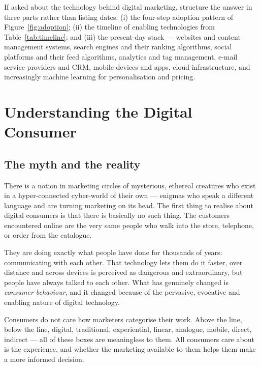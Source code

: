 \documentclass{MMTextbook}
\begin{document}
\begin{exambox}
If asked about the technology behind digital marketing, structure the answer in
three parts rather than listing dates: (i) the four-step adoption pattern of
Figure~\ref{fig:adoption}; (ii) the timeline of enabling technologies from
Table~\ref{tab:timeline}; and (iii) the present-day stack --- websites and
content management systems, search engines and their ranking algorithms, social
platforms and their feed algorithms, analytics and tag management, e-mail
service providers and CRM, mobile devices and apps, cloud infrastructure, and
increasingly machine learning for personalisation and pricing.
\end{exambox}

\section{Understanding the Digital Consumer}

\subsection{The myth and the reality}

There is a notion in marketing circles of mysterious, ethereal creatures who
exist in a hyper-connected cyber-world of their own --- enigmas who speak a
different language and are turning marketing on its head. The first thing to
realise about digital consumers is that there is basically no such thing. The
customers encountered online are the very same people who walk into the store,
telephone, or order from the catalogue.

They are doing exactly what people have done for thousands of years:
communicating with each other. That technology lets them do it faster, over
distance and across devices is perceived as dangerous and extraordinary, but
people have always talked to each other. What has genuinely changed is
\emph{consumer behaviour}, and it changed because of the pervasive, evocative
and enabling nature of digital technology.

\begin{keybox}
Consumers do not care how marketers categorise their work. Above the line,
below the line, digital, traditional, experiential, linear, analogue, mobile,
direct, indirect --- all of these boxes are meaningless to them. All consumers
care about is the experience, and whether the marketing available to them helps
them make a more informed decision.
\end{keybox}
\end{document}
